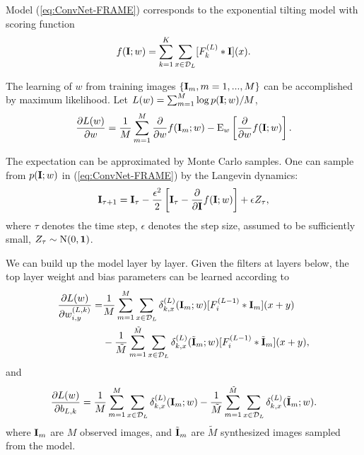 \documentclass[11pt]{article}
\def\E{{\rm E}}
\def\I{{\bf I}}
\begin{document}
Model (\ref{eq:ConvNet-FRAME})  corresponds to the exponential tilting model with scoring function
\begin{equation}
f(\I; w) = \sum_{k=1}^{K} \sum_{x \in {\cal D}_L} [F_k^{(L)}*\I](x). \label{eq:a}
\end{equation}

The learning of $w$ from training images $\{\I_m, m = 1, ..., M\}$ can be accomplished by maximum likelihood. Let $L(w) = \sum_{m=1}^{M} \log p(\I; w)/M$, 
\begin{equation}
	\frac{\partial L(w)}{\partial w} = \frac{1}{M} \sum_{m=1}^{M} \frac{\partial}{\partial w} f(\I_m; w) 
	-  \E_{w} \left[ \frac{\partial}{\partial w} f(\I; w) \right].
\end{equation}


The expectation can be approximated by Monte Carlo samples. One can sample from $p(\I; w)$ in (\ref{eq:ConvNet-FRAME}) by the Langevin dynamics: 
\begin{equation}
\I_{\tau+1} = \I_{\tau} - \frac{\epsilon^2}{2} \left[\I_\tau - \frac{\partial}{\partial \I}f(\I; w) \right] + \epsilon Z_\tau,
\end{equation}
where $\tau$ denotes the time step, $\epsilon$ denotes the step size, assumed to be sufficiently small, $Z_\tau \sim {\rm N}(0, {\bf 1})$.

We can build up the model layer by layer. 
Given the filters at layers below, the top layer weight and bias parameters can be learned according to 
\begin{equation}
\begin{aligned}
\frac{\partial L(w)}{\partial w_{i, y}^{(L, k)}} =& \frac{1}{M} \sum_{m=1}^{M}\sum_{x \in {\cal D}_L} \delta^{(L)}_{k, x}(\I_m; w)  [F^{(L-1)}_{i} * \I_m](x+y) \\
&   -  \frac{1}{\tilde{M}} \sum_{m=1}^{\tilde{M}} \sum_{x \in {\cal D}_L} \delta^{(L)}_{k, x}(\tilde{\I}_m; w)  [F^{(L-1)}_{i} * \tilde{\I}_m](x+y), \\
\end{aligned}
\label{eq:generativeGradient}
\end{equation}
and
\begin{equation}
\begin{aligned}
\frac{\partial L(w)}{\partial b_{L, k}} = \frac{1}{M} \sum_{m=1}^{M}\sum_{x \in {\cal D}_L} \delta^{(L)}_{k, x}(\I_m; w) - \frac{1}{\tilde{M}} \sum_{m=1}^{\tilde{M}} \sum_{x  \in {\cal D}_L} \delta^{(L)}_{k, x}(\tilde{\I}_m; w).
\end{aligned}
\label{eq:generativeGradient0}
\end{equation}
where $\I_m$ are $M$ observed images, and $\tilde{\I}_m$ are $\tilde{M}$ synthesized images sampled from the model.
\end{document}
